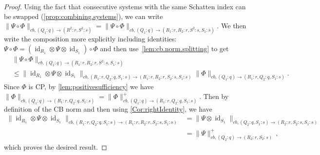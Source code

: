 \documentclass[11pt]{article}
\DeclareMathOperator{\id}{id}
\newcommand{\1}{\ensuremath{\mathbbm{1}}}
\theoremstyle{newdefinition}
\theoremstyle{newplain}
\theoremstyle{myplain}
\begin{document}
\begin{proof}
Using the fact that consecutive systems with the same Schatten index can be swapped (\cref{prop:combining.systems}), we can write $\|\Psi\circ\Phi\|_{cb,(Q_1:q)\to(R^2:r,S^2:s)} = \|\Psi\circ\Phi\|_{cb,(Q_1:q)\to(R_1:r,R_2:r,S^2:s,S_1:s)}$. We then write the composition more explicitly including identities: $\Psi\circ\Phi =  (\id_{R_1} \otimes \Psi \otimes \id_{S_1}) \circ \Phi$ and then use~\cref{lem:cb.norm.splitting} to get
\begin{align}
&\|\Psi\circ\Phi\|_{cb,(Q_1:q)\to(R_1:r,R_2:r,S^2:s,S_1:s)} \\
&\leq \| \id_{R_1} \otimes \Psi \otimes \id_{S_1} \|_{cb,(R_1:r,Q_2:q,S_1:s) \to (R_1:r,R_2:r,S_2:s,S_1:s)} \| \Phi \|_{cb,(Q_1:q) \to (R_1:r,Q_2:q,S_1:s)}.
\end{align}
Since $\Phi$ is CP, by \cref{lem:positivesufficiency} we have $\| \Phi \|_{cb,(Q_1:q) \to (R_1:r,Q_2:q,S_1:s)} = \| \Phi \|_{cb,(Q_1:q) \to (R_1:r,Q_2:q,S_1:s)}^+$. Then by definition of the CB norm and then using \cref{Cor:rightIdentity}, we have 
\begin{align}
\| \id_{R_1} \otimes \Psi \otimes \id_{S_1} \|_{cb,(R_1:r,Q_2:q,S_1:s) \to (R_1:r,R_2:r,S_2:s,S_1:s)} 
&= \| \Psi \otimes \id_{S_1} \|_{cb,(Q_2:q,S_1:s) \to (R_2:r,S_2:s,S_1:s)} \\
&= \| \Psi \|^+_{cb,(Q_2:q) \to (R_2:r,S_2:s)}\,,
\end{align}
which proves the desired result.


\end{proof}
\end{document}
